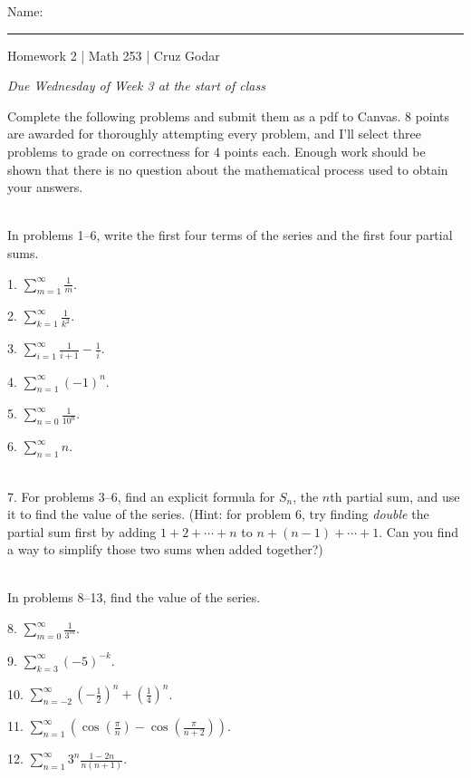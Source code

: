 \documentclass{article}
\begin{document}
\Large Name: \rule{2in}{0.15mm} \hfill Homework 2 | Math 253 | Cruz Godar \vspace{4pt} \normalsize

\textit{Due Wednesday of Week 3 at the start of class}

Complete the following problems and submit them as a pdf to Canvas. 8 points are awarded for thoroughly attempting every problem, and I'll select three problems to grade on correctness for 4 points each. Enough work should be shown that there is no question about the mathematical process used to obtain your answers.

~\\

In problems 1--6, write the first four terms of the series and the first four partial sums.

1. $\displaystyle \sum_{m = 1}^\infty \frac{1}{m}$.

2. $\displaystyle \sum_{k = 1}^\infty \frac{1}{k^2}$.

3. $\displaystyle \sum_{i = 1}^\infty \frac{1}{i + 1} - \frac{1}{i}$.

4. $\displaystyle \sum_{n = 1}^\infty (-1)^n$.

5. $\displaystyle \sum_{n = 0}^\infty \frac{1}{10^n}$.

6. $\displaystyle \sum_{n = 1}^\infty n$.

~\\

7. For problems 3--6, find an explicit formula for $S_n$, the $n$th partial sum, and use it to find the value of the series. (Hint: for problem 6, try finding \textit{double} the partial sum first by adding $1 + 2 + \cdots + n$ to $n + (n - 1) + \cdots + 1$. Can you find a way to simplify those two sums when added together?)

~\\

In problems 8--13, find the value of the series.

8. $\displaystyle \sum_{m = 0}^\infty \frac{1}{3^m}$.

9. $\displaystyle \sum_{k = 3}^\infty (-5)^{-k}$.

10. $\displaystyle \sum_{n = -2}^\infty \left( -\frac{1}{2} \right)^n + \left( \frac{1}{4} \right)^n$.

11. $\displaystyle \sum_{n = 1}^\infty \left( \cos\left( \frac{\pi}{n} \right) - \cos\left( \frac{\pi}{n + 2} \right) \right)$.

12. $\displaystyle \sum_{n = 1}^\infty 3^n\frac{1 - 2n}{n(n + 1)}$.
\end{document}
